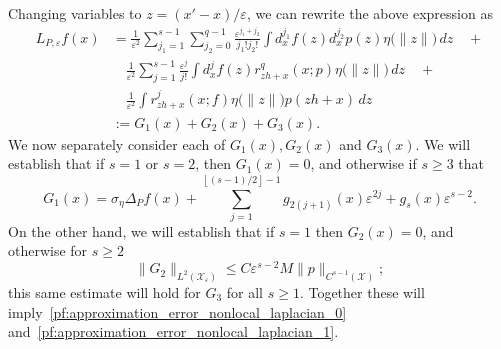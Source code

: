 \documentclass[aos]{imsart}
\theoremstyle{plain}
\theoremstyle{definition}
\theoremstyle{remark}
\newcommand{\mc}[1]{\mathcal{#1}}
\newcommand{\floor}[1]{\left\lfloor #1 \right\rfloor}
\newcommand{\1}{\mathbf{1}}
\begin{document}
Changing variables to $z = (x' - x)/\varepsilon$, we can rewrite the above expression as 
\begin{align*}
L_{P,\varepsilon}f(x) & = \frac{1}{\varepsilon^{2}}\sum_{j_1 = 1}^{s - 1} \sum_{j_2 = 0}^{q - 1}\frac{\varepsilon^{j_1 + j_2}}{j_1!j_2!}  \int d_x^{j_1}f(z) d_x^{j_2}p(z) \eta\bigl(\|z\|\bigr) \,dz \quad + \\
& \quad \frac{1}{\varepsilon^{2}} \sum_{j = 1}^{s - 1} \frac{\varepsilon^j}{j!} \int d_x^jf(z)  r_{zh + x}^{q}(x;p) \eta\bigl(\|z\|\bigr) \,dz \quad  + \\
& \quad \frac{1}{\varepsilon^{2}} \int r_{zh + x}^j(x;f) \eta\bigl(\|z\|\bigr) p(zh + x)\,dz \\
& := G_1(x) + G_2(x) + G_3(x).
\end{align*}
We now separately consider each of $G_1(x),G_2(x)$ and $G_3(x)$. We will establish that if $s = 1$ or $s = 2$, then $G_1(x) = 0$, and otherwise if $s \geq 3$ that
\begin{equation*}
G_1(x) = \sigma_{\eta}\Delta_Pf(x) + \sum_{j = 1}^{\floor{(s - 1)/2} - 1}g_{2(j + 1)}(x)\varepsilon^{2j} + g_{s}(x)\varepsilon^{s - 2}.
\end{equation*}
On the other hand, we will establish that if $s = 1$ then $G_2(x) = 0$, and otherwise for $s \geq 2$
\begin{equation}
\label{pf:approximation_error_nonlocal_laplacian_2}
\|G_2\|_{L^2(\mc{X}_{\varepsilon})} \leq C \varepsilon^{s - 2} M \|p\|_{C^{s - 1}(\mc{X})};
\end{equation}
this same estimate will hold for $G_3$ for all $s \geq 1$. Together these will imply~\eqref{pf:approximation_error_nonlocal_laplacian_0} and~\eqref{pf:approximation_error_nonlocal_laplacian_1}. 
\end{document}
